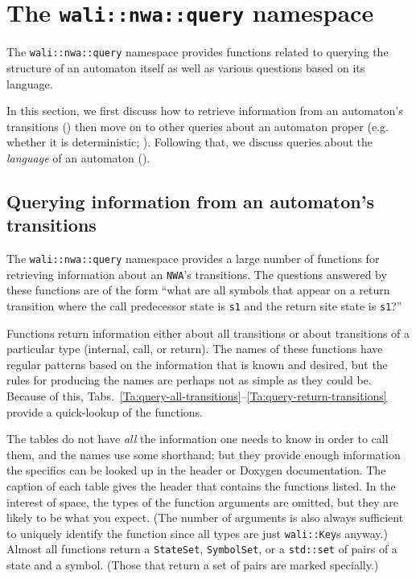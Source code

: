 \section{The \texttt{wali::nwa::query} namespace}
\label{Se:namespace-query}

The \texttt{wali::nwa::query} namespace provides functions related to
querying the structure of an automaton itself as well as various questions
based on its language.

In this section, we first discuss how to retrieve information from an
automaton's transitions () then move on to other
queries about an automaton proper (e.g. whether it is deterministic;
). Following that, we discuss queries about the
\textsl{language} of an automaton ().


\subsection{Querying information from an automaton's transitions}
\label{Se:query-transitions}
The \texttt{wali::nwa::query} namespace provides a large number of functions
for retrieving information about an \texttt{NWA}'s transitions. The questions
answered by these functions are of the form ``what are all symbols that
appear on a return transition where the call predecessor state is \texttt{s1}
and the return site state is \texttt{s1}?''

Functions return information either about all transitions or about
transitions of a particular type (internal, call, or return). The names of
these functions have regular patterns based on the information that is
known and desired, but the rules for producing the names are perhaps not as
simple as they could be. Because of this,
Tabs.~\ref{Ta:query-all-transitions}--\ref{Ta:query-return-transitions}
provide a quick-lookup of the functions.

The tables do not have \textsl{all} the information one needs to know in
order to call them, and the names use some shorthand; but they provide enough
information the specifics can be
looked up in the header or Doxygen documentation. The caption of each table
gives the header that contains the functions listed. In the interest of
space, the types of the function arguments are omitted, but they are likely to
be what you expect. (The number of arguments is also always sufficient to
uniquely identify the function since all types are just \texttt{wali::Key}s
anyway.) Almost all functions return a \texttt{StateSet}, \texttt{SymbolSet},
or a \texttt{std::set} of pairs of a state and a symbol. (Those that return a
set of pairs are marked specially.)

